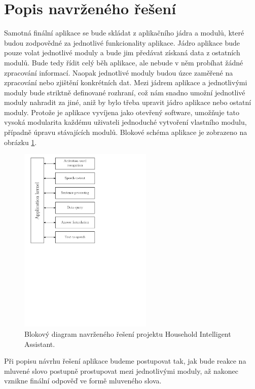 \documentclass[12pt,a4paper]{article}
\begin{document}
\section*{Popis navrženého řešení}
Samotná finální aplikace se bude skládat z aplikačního jádra a modulů, které budou zodpovědné za jednotlivé funkcionality aplikace. Jádro aplikace bude pouze volat jednotlivé moduly a bude jim předávat získaná data z ostatních modulů. Bude tedy řídit celý běh aplikace, ale nebude v něm probíhat žádné zpracování informací. Naopak jednotlivé moduly budou úzce zaměřené na zpracování nebo zjištění konkrétních dat. Mezi jádrem aplikace a jednotlivými moduly bude striktně definované rozhraní, což nám snadno umožní jednotlivé moduly nahradit za jiné, aniž by bylo třeba upravit jádro aplikace nebo ostatní moduly. Protože je aplikace vyvíjena jako otevřený software, umožňuje tato vysoká modularita každému uživateli jednoduché vytvoření vlastního modulu, případně úpravu stávajících modulů. Blokové schéma aplikace je zobrazeno na obrázku \ref{fig:diagram api}.

\begin{figure}[ht]
	\begin{center}
	\includegraphics[height = 9cm]{blockDiagram.pdf}
	\caption{Blokový diagram navrženého řešení projektu Household Intelligent Assistant.}
	\label{fig:diagram api}
	\end{center}
\end{figure}

Při popisu návrhu řešení aplikace budeme postupovat tak, jak bude reakce na mluvené slovo postupně prostupovat mezi jednotlivými moduly, až nakonec vznikne finální odpověď ve formě mluveného slova.
\end{document}

